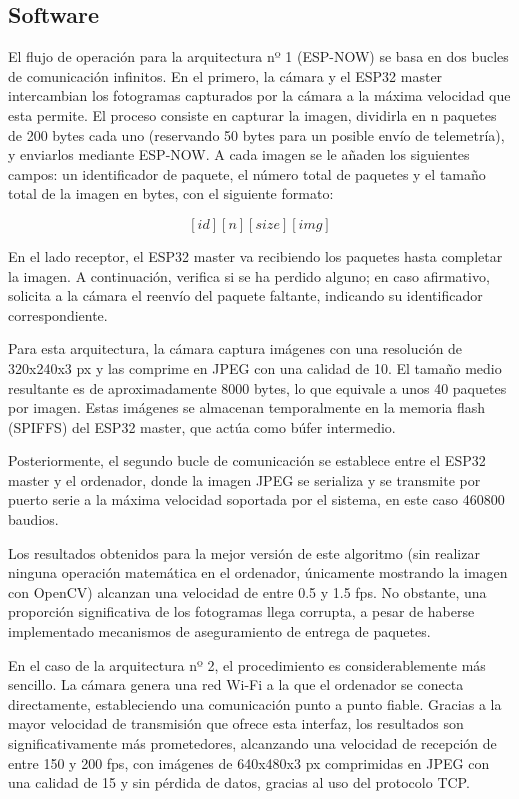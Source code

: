       \subsection{Software}



El flujo de operación para la arquitectura nº 1 (ESP-NOW) se basa en dos bucles de comunicación infinitos. En el primero, la cámara y el ESP32 master intercambian los fotogramas capturados por la cámara a la máxima velocidad que esta permite. El proceso consiste en capturar la imagen, dividirla en n paquetes de 200 bytes cada uno (reservando 50 bytes para un posible envío de telemetría), y enviarlos mediante ESP-NOW. A cada imagen se le añaden los siguientes campos: un identificador de paquete, el número total de paquetes y el tamaño total de la imagen en bytes, con el siguiente formato:

$$[id][n][size][img]$$

En el lado receptor, el ESP32 master va recibiendo los paquetes hasta completar la imagen. A continuación, verifica si se ha perdido alguno; en caso afirmativo, solicita a la cámara el reenvío del paquete faltante, indicando su identificador correspondiente.

Para esta arquitectura, la cámara captura imágenes con una resolución de 320x240x3 px y las comprime en JPEG con una calidad de 10. El tamaño medio resultante es de aproximadamente 8000 bytes, lo que equivale a unos 40 paquetes por imagen. Estas imágenes se almacenan temporalmente en la memoria flash (SPIFFS) del ESP32 master, que actúa como búfer intermedio.

Posteriormente, el segundo bucle de comunicación se establece entre el ESP32 master y el ordenador, donde la imagen JPEG se serializa y se transmite por puerto serie a la máxima velocidad soportada por el sistema, en este caso 460800 baudios.

Los resultados obtenidos para la mejor versión de este algoritmo (sin realizar ninguna operación matemática en el ordenador, únicamente mostrando la imagen con OpenCV) alcanzan una velocidad de entre 0.5 y 1.5 fps. No obstante, una proporción significativa de los fotogramas llega corrupta, a pesar de haberse implementado mecanismos de aseguramiento de entrega de paquetes.

En el caso de la arquitectura nº 2, el procedimiento es considerablemente más sencillo. La cámara genera una red Wi-Fi a la que el ordenador se conecta directamente, estableciendo una comunicación punto a punto fiable. Gracias a la mayor velocidad de transmisión que ofrece esta interfaz, los resultados son significativamente más prometedores, alcanzando una velocidad de recepción de entre 150 y 200 fps, con imágenes de 640x480x3 px comprimidas en JPEG con una calidad de 15 y sin pérdida de datos, gracias al uso del protocolo TCP.

